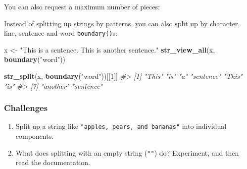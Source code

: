 \documentclass[]{book}
\newenvironment{Shaded}{\begin{snugshade}}{\end{snugshade}}
\newcommand{\KeywordTok}[1]{\textcolor[rgb]{0.13,0.29,0.53}{\textbf{#1}}}
\newcommand{\DataTypeTok}[1]{\textcolor[rgb]{0.13,0.29,0.53}{#1}}
\newcommand{\DecValTok}[1]{\textcolor[rgb]{0.00,0.00,0.81}{#1}}
\newcommand{\StringTok}[1]{\textcolor[rgb]{0.31,0.60,0.02}{#1}}
\newcommand{\CommentTok}[1]{\textcolor[rgb]{0.56,0.35,0.01}{\textit{#1}}}
\newcommand{\OtherTok}[1]{\textcolor[rgb]{0.56,0.35,0.01}{#1}}
\newcommand{\OperatorTok}[1]{\textcolor[rgb]{0.81,0.36,0.00}{\textbf{#1}}}
\newcommand{\NormalTok}[1]{#1}
\begin{document}
You can also request a maximum number of pieces:

\begin{Shaded}
\end{Shaded}

Instead of splitting up strings by patterns, you can also split up by
character, line, sentence and word \texttt{boundary()}s:

\begin{Shaded}
\begin{Highlighting}[]
\NormalTok{x <-}\StringTok{ "This is a sentence.  This is another sentence."}
\KeywordTok{str_view_all}\NormalTok{(x, }\KeywordTok{boundary}\NormalTok{(}\StringTok{"word"}\NormalTok{))}
\end{Highlighting}
\end{Shaded}

\hypertarget{htmlwidget-e8092118b2671020ef37}{}

\begin{Shaded}
\begin{Highlighting}[]
\KeywordTok{str_split}\NormalTok{(x, }\KeywordTok{boundary}\NormalTok{(}\StringTok{"word"}\NormalTok{))[[}\DecValTok{1}\NormalTok{]]}
\CommentTok{#> [1] "This"     "is"       "a"        "sentence" "This"     "is"      }
\CommentTok{#> [7] "another"  "sentence"}
\end{Highlighting}
\end{Shaded}

\subsubsection*{Challenges}\label{challenges-19}

\begin{enumerate}
\def\labelenumi{\arabic{enumi}.}
\item
  Split up a string like \texttt{"apples,\ pears,\ and\ bananas"} into
  individual components.
\item
  What does splitting with an empty string (\texttt{""}) do? Experiment,
  and then read the documentation.
\end{enumerate}
\end{document}
